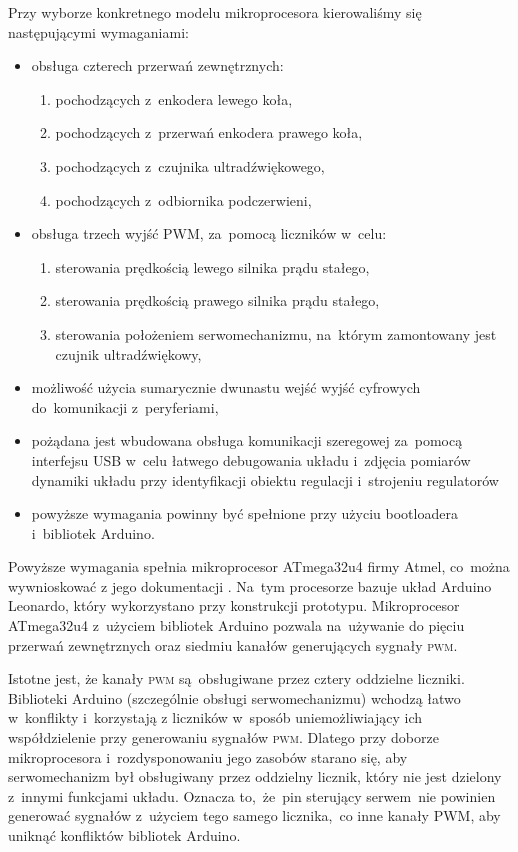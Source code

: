 \documentclass[11pt]{article}
\begin{document}
\noindent\begin{minipage}{\linewidth}
Przy wyborze konkretnego modelu mikroprocesora kierowaliśmy się następującymi wymaganiami:
\begin{itemize}
	\item obsługa czterech przerwań zewnętrznych:
		\begin{enumerate}
			\item pochodzących z~enkodera lewego koła,
			\item pochodzących z~przerwań enkodera prawego koła,
			\item pochodzących z~czujnika ultradźwiękowego,
			\item pochodzących z~odbiornika podczerwieni, 
		\end{enumerate}
	\item obsługa trzech wyjść PWM, za~pomocą liczników w~celu:
		\begin{enumerate}
			\item sterowania prędkością lewego silnika prądu stałego,
			\item sterowania prędkością prawego silnika prądu stałego,
			\item sterowania położeniem serwomechanizmu, na~którym zamontowany jest czujnik ultradźwiękowy,
		\end{enumerate}
	\item możliwość użycia sumarycznie dwunastu wejść wyjść cyfrowych do~komunikacji z~peryferiami,
	\item pożądana jest wbudowana obsługa komunikacji szeregowej za~pomocą interfejsu USB w~celu łatwego debugowania układu i~zdjęcia pomiarów dynamiki układu przy identyfikacji obiektu regulacji i~strojeniu regulatorów
	\item powyższe wymagania powinny być spełnione przy użyciu bootloadera i~bibliotek Arduino.
\end{itemize}
\hspace{5mm}
\end{minipage}

Powyższe wymagania spełnia mikroprocesor ATmega32u4 firmy Atmel, co~można wywnioskować z jego dokumentacji \cite{atmega32u4_datasheet}.
Na~tym procesorze bazuje układ Arduino Leonardo, który wykorzystano przy konstrukcji prototypu.
Mikroprocesor ATmega32u4 z~użyciem bibliotek Arduino pozwala na~używanie do pięciu przerwań zewnętrznych oraz siedmiu kanałów generujących sygnały \textsc{pwm}.

Istotne jest, że kanały \textsc{pwm} są~obsługiwane przez cztery oddzielne liczniki. Biblioteki Arduino (szczególnie obsługi serwomechanizmu) wchodzą łatwo w~konflikty i~korzystają z liczników w~sposób uniemożliwiający ich współdzielenie przy generowaniu sygnałów \textsc{pwm}.
Dlatego przy doborze mikroprocesora i~rozdysponowaniu jego zasobów starano się, aby serwomechanizm był obsługiwany przez oddzielny licznik, który nie jest dzielony z~innymi funkcjami układu.
Oznacza to,~że~pin sterujący serwem~nie powinien generować sygnałów z~użyciem tego samego licznika,~co inne kanały PWM, aby uniknąć konfliktów bibliotek Arduino.
\end{document}
